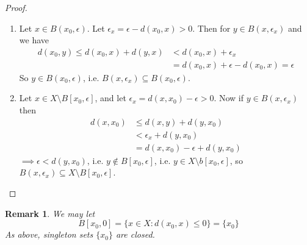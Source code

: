 \documentclass[11pt, oneside]{book}
\theoremstyle{break}
\newtheorem*{proof}{Proof}
\newtheorem*{remark}{Remark}
\begin{document}
\begin{proof}
	\begin{enumerate}
		\item Let $x \in B(x_0, \epsilon)$. Let $\epsilon_x = \epsilon - d(x_0, x) > 0$. Then for $y \in B(x, \epsilon_x)$ and we have
			\begin{align*}
				d(x_0, y) \leq d(x_0, x) + d(y, x) &< d(x_0, x) + \epsilon_x \\
						&= d(x_0, x) + \epsilon - d(x_0, x) = \epsilon
			\end{align*}
			So $y \in B(x_0, \epsilon)$, i.e. $B(x, \epsilon_x) \subseteq B(x_0, \epsilon)$.

		\item Let $x \in X \setminus B[x_0, \epsilon]$, and let $\epsilon_x = d(x, x_0) - \epsilon > 0$. Now if $y \in B(x, \epsilon_x)$ then
			\begin{align*}
				d(x, x_0) &\leq d(x,y) + d(y, x_0) \\
					&< \epsilon_x + d(y, x_0) \\
					&= d(x, x_0) - \epsilon + d(y, x_0)
			\end{align*}
			$\implies \epsilon < d(y, x_0)$, i.e. $y \notin B[x_0, \epsilon]$, i.e. $y \in X \setminus b[x_0, \epsilon]$, so $B(x, \epsilon_x) \subseteq X \setminus B[x_0, \epsilon]$.
	\end{enumerate}
\end{proof}

\begin{remark}
	We may let
	\begin{equation}
		B[x_0, 0] = \{x \in X : d(x_0, x) \leq 0 \} = \{x_0\}
	\end{equation}
	As above, singleton sets $\{x_0\}$ are closed.
\end{remark}
\end{document}
